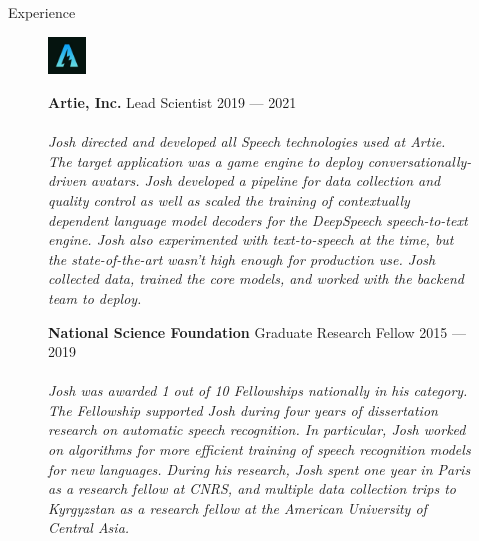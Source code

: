 \documentclass{resume} %
\begin{document}
\begin{rSection}{Experience}
  \begin{figure}[H]
    \begin{minipage}{0.2\textwidth}
      \centering
      \includegraphics[width=1cm]{imgs/artie-logo-small.jpeg}
    \end{minipage}
    \begin{minipage}{0.8\textwidth}
      {\bf Artie, Inc.} \hfill Lead Scientist \hfill {2019 --- 2021} \\ \\
      \textit{Josh directed and developed all Speech technologies used at Artie. The target application was a game engine to deploy conversationally-driven avatars. Josh developed a pipeline for data collection and quality control as well as scaled the training of contextually dependent language model decoders for the DeepSpeech speech-to-text engine. Josh also experimented with text-to-speech at the time, but the state-of-the-art wasn't high enough for production use. Josh collected data, trained the core models, and worked with the backend team to deploy.} \\
    \end{minipage}
  \end{figure}

  \begin{figure}[H]
    \begin{minipage}{0.2\textwidth}
      \centering
      
    \end{minipage}
    \begin{minipage}{0.8\textwidth}
      {\bf National Science Foundation} \hfill Graduate Research Fellow \hfill {2015 --- 2019} \\ \\
      \textit{Josh was awarded 1 out of 10 Fellowships nationally in his category. The Fellowship supported Josh during four years of dissertation research on automatic speech recognition. In particular, Josh worked on algorithms for more efficient training of speech recognition models for new languages. During his research, Josh spent one year in Paris as a research fellow at CNRS, and multiple data collection trips to Kyrgyzstan as a research fellow at the American University of Central Asia.} \\
    \end{minipage}
  \end{figure}


\end{rSection}
\end{document}
